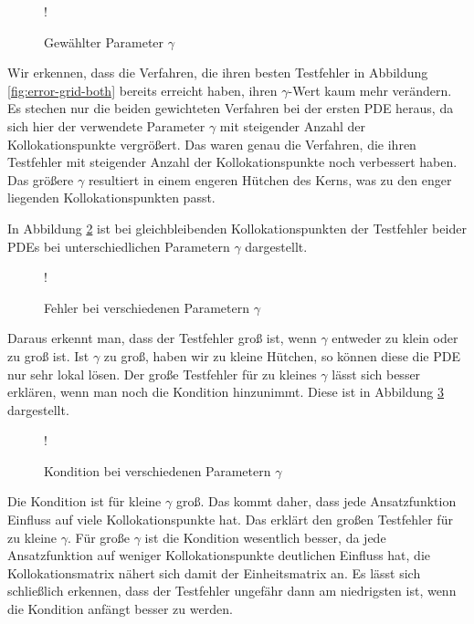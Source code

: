 \begin{figure}[ht]
\centering
\resizebox {\columnwidth} {!} {

}
\caption{Gewählter Parameter $\gamma$}
\label{fig:gamma-grid}
\end{figure}
Wir erkennen, dass die Verfahren, die ihren besten Testfehler in Abbildung \ref{fig:error-grid-both} bereits erreicht haben, ihren $\gamma$-Wert kaum mehr verändern. Es stechen nur die beiden gewichteten Verfahren bei der ersten \ac{PDE} heraus, da sich hier der verwendete Parameter $\gamma$ mit steigender Anzahl der Kollokationspunkte vergrößert. Das waren genau die Verfahren, die ihren Testfehler mit steigender Anzahl der Kollokationspunkte noch verbessert haben. Das größere $\gamma$ resultiert in einem engeren \glqq Hütchen\grqq{} des Kerns, was zu den enger liegenden Kollokationspunkten passt.

In Abbildung \ref{fig:gamma-fehler} ist bei gleichbleibenden Kollokationspunkten der Testfehler beider \acp{PDE} bei unterschiedlichen Parametern $\gamma$ dargestellt.

\begin{figure}[ht]
\centering
\resizebox {\columnwidth} {!} {

}
\caption{Fehler bei verschiedenen Parametern $\gamma$}
\label{fig:gamma-fehler}
\end{figure}

Daraus erkennt man, dass der Testfehler groß ist, wenn $\gamma$ entweder zu klein oder zu groß ist. Ist $\gamma$ zu groß, haben wir zu kleine \glqq Hütchen\grqq , so können diese die \ac{PDE} nur sehr lokal lösen. Der große Testfehler für zu kleines $\gamma$ lässt sich besser erklären, wenn man noch die Kondition hinzunimmt. Diese ist in Abbildung \ref{fig:kondition} dargestellt.

\begin{figure}[ht]
\centering
\resizebox {\columnwidth} {!} {

}
\caption{Kondition bei verschiedenen Parametern $\gamma$}
\label{fig:kondition}
\end{figure}

Die Kondition ist für kleine $\gamma$ groß. Das kommt daher, dass jede Ansatzfunktion \glqq Einfluss\grqq{}  auf viele Kollokationspunkte hat. Das erklärt den großen Testfehler für zu kleine $\gamma$. Für große $\gamma$ ist die Kondition wesentlich besser, da jede Ansatzfunktion auf weniger Kollokationspunkte deutlichen \glqq Einfluss\grqq{} hat, die Kollokationsmatrix \glqq nähert\grqq{} sich damit der Einheitsmatrix an. Es lässt sich schließlich erkennen, dass der Testfehler ungefähr dann am niedrigsten ist, wenn die Kondition anfängt besser zu werden. 

